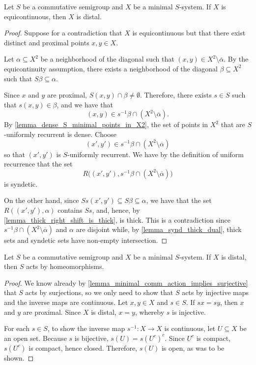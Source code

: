 \begin{lemma}
\label{lemma_equi_implies_distal}
    Let $S$ be a commutative semigroup and $X$ be a minimal $S$-system.  If $X$ is equicontinuous, then $X$ is distal.
\end{lemma}

\begin{proof}
    Suppose for a contradiction that $X$ is equicontinuous but that there exist distinct and proximal points $x, y \in X$.
    
    Let $\alpha \subseteq X^2$ be a neighborhood of the diagonal such that $(x,y) \in X^2 \setminus \overline{\alpha}$.  By the equicontinuity assumption, there exists a neighborhood of the diagonal $\beta \subseteq X^2$ such that $S \beta \subseteq \alpha$.
    
    Since $x$ and $y$ are proximal, $S(x,y) \cap \beta \neq \emptyset$.  Therefore, there exists $s \in S$ such that $s(x,y) \in \beta$, and we have that
    \[(x,y) \in s^{-1} \beta \cap (X^2 \setminus \overline{\alpha}).\]
    By \cref{lemma_dense_S_minimal_points_in_X2}, the set of points in $X^2$ that are $S$-uniformly recurrent is dense. Choose
    \[(x',y') \in s^{-1} \beta \cap (X^2 \setminus \overline{\alpha})\]
    so that $(x',y')$ is $S$-uniformly recurrent.  We have by the definition of uniform recurrence that the set
    \[R\big((x',y'), s^{-1} \beta \cap (X^2 \setminus \overline{\alpha})\big)\]
    is syndetic.

    On the other hand, since $Ss(x',y') \subseteq  S\beta \subseteq \alpha$, we have that the set $R((x',y'), \alpha)$ contains $Ss$, and, hence, by \cref{lemma_thick_right_shift_is_thick}, is thick.  This is a contradiction since $s^{-1} \beta \cap (X^2 \setminus \overline{\alpha})$ and $\alpha$ are disjoint while, by \cref{lemma_synd_thick_dual}, thick sets and syndetic sets have non-empty intersection.
\end{proof}

\begin{lemma}
\label{lemma_distal_implies_homeo}
    Let $S$ be a commutative semigroup and $X$ be a minimal $S$-system.  If $X$ is distal, then $S$ acts by homeomorphisms.
\end{lemma}

\begin{proof}
    We know already by \cref{lemma_minimal_comm_action_implies_surjective} that $S$ acts by surjections, so we only need to show that $S$ acts by injective maps and the inverse maps are continuous. Let $x, y \in X$ and $s \in S$.  If $sx = sy$, then $x$ and $y$ are proximal.  Since $X$ is distal, $x = y$, whereby $s$ is injective. 

    For each $s \in S$, to show the inverse map $s^{-1} : X \to X$ is continuous, let $U \subseteq X$ be an open set. Because $s$ is bijective, $s (U) = s (U^c)^c.$
    Since $U^c$ is compact, $s(U^c)$ is compact, hence closed. Therefore, $s(U)$ is open, as was to be shown.
\end{proof}

